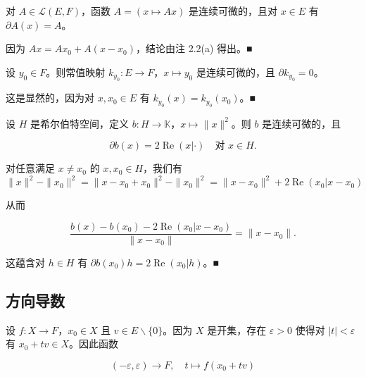 \begin{example}

\begin{items}
\item

对 $ A \in \mathcal{L}(E, F) $，函数 $ A = (x \mapsto Ax) $ 是连续可微的，且对 $ x \in E $ 有 $ \partial A(x) = A $。

\proofhead
因为 $ Ax = Ax_0 + A(x - x_0) $，结论由注 2.2(a) 得出。\nobreak\hspace{0.35em}■
\item

设 $ y_0 \in F $。则常值映射 $ k_{y_0} : E \to F $，$ x \mapsto y_0 $ 是连续可微的，且 $ \partial k_{y_0} = 0 $。

\proofhead
这是显然的，因为对 $ x, x_0 \in E $ 有 $ k_{y_0}(x) = k_{y_0}(x_0) $。\nobreak\hspace{0.35em}■
\item

设 $ H $ 是希尔伯特空间，定义 $ b : H \to \mathbb{K} $，$ x \mapsto \|x\|^2 $。则 $ b $ 是连续可微的，且

\[
\partial b(x) = 2 \operatorname{Re}(x|\cdot) \quad \text{对 } x \in H .
\]

\proofhead
对任意满足 $ x \ne x_0 $ 的 $ x, x_0 \in H $，我们有
\[
\|x\|^2 - \|x_0\|^2 = \|x - x_0 + x_0\|^2 - \|x_0\|^2 = \|x - x_0\|^2 + 2 \operatorname{Re}(x_0 | x - x_0)
\]

从而

\[
\frac{b(x) - b(x_0) - 2 \operatorname{Re}(x_0 | x - x_0)}{\|x - x_0\|} = \|x - x_0\| .
\]

这蕴含对 $ h \in H $ 有 $ \partial b(x_0)h = 2 \operatorname{Re}(x_0 | h) $。\nobreak\hspace{0.35em}■

\end{items}

\end{example}

\subsection*{方向导数}

设 $ f : X \to F $，$ x_0 \in X $ 且 $ v \in E \backslash \{0\} $。因为 $ X $ 是开集，存在 $ \varepsilon > 0 $ 使得对 $ |t| < \varepsilon $ 有 $ x_0 + tv \in X $。因此函数

\[
(-\varepsilon, \varepsilon) \to F , \quad t \mapsto f(x_0 + tv)
\]

